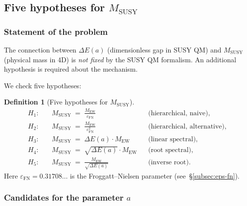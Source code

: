 \documentclass[11pt,a4paper]{article}
\theoremstyle{definition}
\newtheorem{definition}[theorem]{Definition}
\begin{document}
\subsection{Five hypotheses for \texorpdfstring{$M_{\text{SUSY}}$}{M\_SUSY}}
\label{subsec:susy-hypotheses}

\subsubsection{Statement of the problem}

The connection between $\Delta E(a)$ (dimensionless gap in SUSY QM)
and $M_{\text{SUSY}}$ (physical mass in 4D) is \emph{not fixed}
by the SUSY QM formalism. An additional hypothesis is required
about the mechanism.

\medskip\noindent
We check five hypotheses:

\begin{definition}[Five hypotheses for $M_{\text{SUSY}}$]
\label{def:five-hypotheses}
\begin{align}
    H_1:&\quad M_{\text{SUSY}} \;=\; \frac{M_{\text{EW}}}{\varepsilon_{\text{FN}}}
    && \text{(hierarchical, naive)}, \label{eq:H1-hyp} \\[0.3em]
    H_2:&\quad M_{\text{SUSY}} \;=\; \frac{M_{\text{EW}}}{\varepsilon_{\text{FN}}^2}
    && \text{(hierarchical, alternative)}, \label{eq:H2-hyp} \\[0.3em]
    H_3:&\quad M_{\text{SUSY}} \;=\; \Delta E(a) \cdot M_{\text{EW}}
    && \text{(linear spectral)}, \label{eq:H3} \\[0.3em]
    H_4:&\quad M_{\text{SUSY}} \;=\; \sqrt{\Delta E(a)} \cdot M_{\text{EW}}
    && \text{(root spectral)}, \label{eq:H4} \\[0.3em]
    H_5:&\quad M_{\text{SUSY}} \;=\; \frac{M_{\text{EW}}}{\sqrt{\Delta E(a)}}
    && \text{(inverse root)}. \label{eq:H5}
\end{align}
Here $\varepsilon_{\text{FN}} = 0.31708\ldots$ is the
Froggatt--Nielsen parameter (see~\S\ref{subsec:eps-fn}).
\end{definition}

\subsubsection{Candidates for the parameter \texorpdfstring{$a$}{a}}
\end{document}
